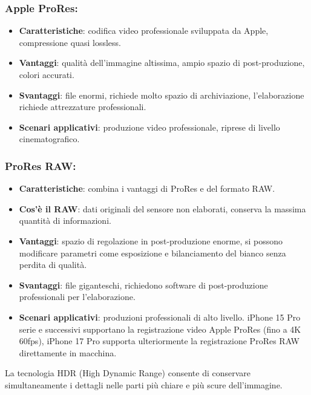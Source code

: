 \subsubsection*{Apple ProRes:}

\begin{itemize}
  \item \textbf{Caratteristiche}: codifica video professionale sviluppata da Apple, compressione quasi lossless.
  \item \textbf{Vantaggi}: qualità dell'immagine altissima, ampio spazio di post-produzione, colori accurati.
  \item \textbf{Svantaggi}: file enormi, richiede molto spazio di archiviazione, l'elaborazione richiede attrezzature professionali.
  \item \textbf{Scenari applicativi}: produzione video professionale, riprese di livello cinematografico.
\end{itemize}

\subsubsection*{ProRes RAW:}

\begin{itemize}
  \item \textbf{Caratteristiche}: combina i vantaggi di ProRes e del formato RAW.
  \item \textbf{Cos'è il RAW}: dati originali del sensore non elaborati, conserva la massima quantità di informazioni.
  \item \textbf{Vantaggi}: spazio di regolazione in post-produzione enorme, si possono modificare parametri come esposizione e bilanciamento del bianco senza perdita di qualità.
  \item \textbf{Svantaggi}: file giganteschi, richiedono software di post-produzione professionali per l'elaborazione.
  \item \textbf{Scenari applicativi}: produzioni professionali di alto livello. iPhone 15 Pro serie e successivi supportano la registrazione video Apple ProRes (fino a 4K 60fps), iPhone 17 Pro supporta ulteriormente la registrazione ProRes RAW direttamente in macchina.
\end{itemize}


La tecnologia HDR (High Dynamic Range) consente di conservare simultaneamente i dettagli nelle parti più chiare e più scure dell'immagine.

